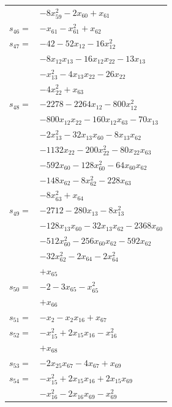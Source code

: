\begin{longtable}{@{}r@{\;}l@{}}
 & \(\displaystyle -8x_{59}^{2} -2x_{60} +x_{61}\) \\[3pt]
\(s_{46}=\) & \(\displaystyle -x_{61} -x_{61}^{2} +x_{62}\) \\[3pt]
\(s_{47}=\) & \(\displaystyle -42 -52x_{12} -16x_{12}^{2}\) \\
 & \(\displaystyle -8x_{12}x_{13} -16x_{12}x_{22} -13x_{13}\) \\
 & \(\displaystyle -x_{13}^{2} -4x_{13}x_{22} -26x_{22}\) \\
 & \(\displaystyle -4x_{22}^{2} +x_{63}\) \\[3pt]
\(s_{48}=\) & \(\displaystyle -2278 -2264x_{12} -800x_{12}^{2}\) \\
 & \(\displaystyle -800x_{12}x_{22} -160x_{12}x_{63} -70x_{13}\) \\
 & \(\displaystyle -2x_{13}^{2} -32x_{13}x_{60} -8x_{13}x_{62}\) \\
 & \(\displaystyle -1132x_{22} -200x_{22}^{2} -80x_{22}x_{63}\) \\
 & \(\displaystyle -592x_{60} -128x_{60}^{2} -64x_{60}x_{62}\) \\
 & \(\displaystyle -148x_{62} -8x_{62}^{2} -228x_{63}\) \\
 & \(\displaystyle -8x_{63}^{2} +x_{64}\) \\[3pt]
\(s_{49}=\) & \(\displaystyle -2712 -280x_{13} -8x_{13}^{2}\) \\
 & \(\displaystyle -128x_{13}x_{60} -32x_{13}x_{62} -2368x_{60}\) \\
 & \(\displaystyle -512x_{60}^{2} -256x_{60}x_{62} -592x_{62}\) \\
 & \(\displaystyle -32x_{62}^{2} -2x_{64} -2x_{64}^{2}\) \\
 & \(\displaystyle +x_{65}\) \\[3pt]
\(s_{50}=\) & \(\displaystyle -2 -3x_{65} -x_{65}^{2}\) \\
 & \(\displaystyle +x_{66}\) \\[3pt]
\(s_{51}=\) & \(\displaystyle -x_{2} -x_{2}x_{16} +x_{67}\) \\[3pt]
\(s_{52}=\) & \(\displaystyle -x_{15}^{2} +2x_{15}x_{16} -x_{16}^{2}\) \\
 & \(\displaystyle +x_{68}\) \\[3pt]
\(s_{53}=\) & \(\displaystyle -2x_{25}x_{67} -4x_{67} +x_{69}\) \\[3pt]
\(s_{54}=\) & \(\displaystyle -x_{15}^{2} +2x_{15}x_{16} +2x_{15}x_{69}\) \\
 & \(\displaystyle -x_{16}^{2} -2x_{16}x_{69} -x_{69}^{2}\) \\

\end{longtable}
